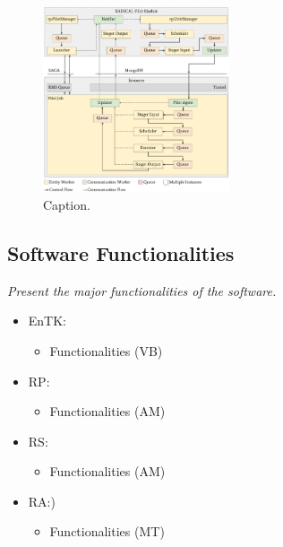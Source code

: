 \documentclass[preprint,12pt, a4paper]{elsarticle}
\begin{document}

\begin{figure}
    \centering
    \includegraphics[width=0.49\textwidth]{figures/arch_rp.pdf}
    \caption{Caption.}\label{fig:arch_rp}
\end{figure}




\subsection{Software Functionalities}\label{sec:functionalities}

{\em Present the major functionalities of the software.}

\begin{itemize}
  \item EnTK\@:
  \begin{itemize}
    \item Functionalities (VB)
  \end{itemize}
  \item RP\@: 
  \begin{itemize}
    \item Functionalities (AM)
  \end{itemize}
  \item RS\@:
  \begin{itemize}
    \item Functionalities (AM)
  \end{itemize}
  \item RA\@:)
  \begin{itemize}
    \item Functionalities (MT)
  \end{itemize}
\end{itemize}
\end{document}
